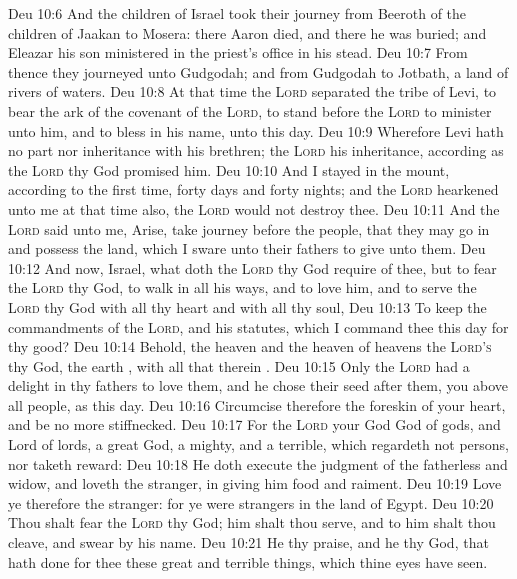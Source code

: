 \vs Deu 10:6 And the children of Israel took their journey from Beeroth of the children of Jaakan to Mosera: there Aaron died, and there he was buried; and Eleazar his son ministered in the priest's office in his stead.
\vs Deu 10:7 From thence they journeyed unto Gudgodah; and from Gudgodah to Jotbath, a land of rivers of waters.
\vs Deu 10:8 At that time the \textsc{Lord} separated the tribe of Levi, to bear the ark of the covenant of the \textsc{Lord}, to stand before the \textsc{Lord} to minister unto him, and to bless in his name, unto this day.
\vs Deu 10:9 Wherefore Levi hath no part nor inheritance with his brethren; the \textsc{Lord}  his inheritance, according as the \textsc{Lord} thy God promised him.
\vs Deu 10:10 And I stayed in the mount, according to the first time, forty days and forty nights; and the \textsc{Lord} hearkened unto me at that time also,  the \textsc{Lord} would not destroy thee.
\vs Deu 10:11 And the \textsc{Lord} said unto me, Arise, take  journey before the people, that they may go in and possess the land, which I sware unto their fathers to give unto them.
\vs Deu 10:12 And now, Israel, what doth the \textsc{Lord} thy God require of thee, but to fear the \textsc{Lord} thy God, to walk in all his ways, and to love him, and to serve the \textsc{Lord} thy God with all thy heart and with all thy soul,
\vs Deu 10:13 To keep the commandments of the \textsc{Lord}, and his statutes, which I command thee this day for thy good?
\vs Deu 10:14 Behold, the heaven and the heaven of heavens  the \textsc{Lord's} thy God, the earth , with all that therein .
\vs Deu 10:15 Only the \textsc{Lord} had a delight in thy fathers to love them, and he chose their seed after them,  you above all people, as  this day.
\vs Deu 10:16 Circumcise therefore the foreskin of your heart, and be no more stiffnecked.
\vs Deu 10:17 For the \textsc{Lord} your God  God of gods, and Lord of lords, a great God, a mighty, and a terrible, which regardeth not persons, nor taketh reward:
\vs Deu 10:18 He doth execute the judgment of the fatherless and widow, and loveth the stranger, in giving him food and raiment.
\vs Deu 10:19 Love ye therefore the stranger: for ye were strangers in the land of Egypt.
\vs Deu 10:20 Thou shalt fear the \textsc{Lord} thy God; him shalt thou serve, and to him shalt thou cleave, and swear by his name.
\vs Deu 10:21 He  thy praise, and he  thy God, that hath done for thee these great and terrible things, which thine eyes have seen.
